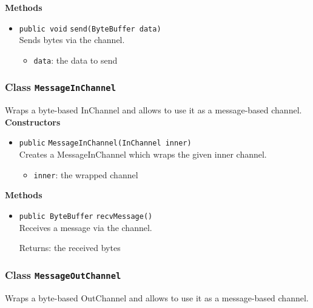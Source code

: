 \textbf{Methods}
\begin{itemize}
\item \lstinline|public void| \lstinline|send|\lstinline|(ByteBuffer data)|\\
Sends bytes via the channel.
\begin{itemize}
\item \lstinline|data|: the data to send
\end{itemize}



\end{itemize}

\subsubsection{Class \lstinline|MessageInChannel|}
Wraps a byte-based InChannel and allows to use it as a message-based
 channel. \\




\textbf{Constructors}
\begin{itemize}
\item \lstinline|public| \lstinline|MessageInChannel|\lstinline|(InChannel inner)|\\
Creates a MessageInChannel which wraps the given inner channel.
\begin{itemize}
\item \lstinline|inner|: the wrapped channel
\end{itemize}



\end{itemize}


\textbf{Methods}
\begin{itemize}
\item \lstinline|public ByteBuffer| \lstinline|recvMessage|\lstinline|()|\\
Receives a message via the channel.

Returns: the received bytes

\end{itemize}

\subsubsection{Class \lstinline|MessageOutChannel|}
Wraps a byte-based OutChannel and allows to use it as a message-based
 channel. \\




